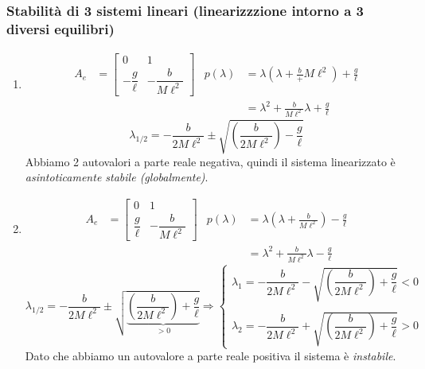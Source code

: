 \documentclass{article}
\numberwithin{equation}{subsection}
\begin{document}
\subsubsection{Stabilità di 3 sistemi lineari (linearizzzione intorno a 3 diversi equilibri)}
\begin{enumerate}
    \item 
    \begin{align*}
        A_e &= \begin{bmatrix} 0&1\\-\dfrac{g}{\ell}&-\dfrac{b}{M \ell^2} \end{bmatrix} & p(\lambda) &= \lambda \left( \lambda + \frac{b} +{M\ell^2} \right) + \frac{g}{\ell}\\
        & & &=\lambda^2 + \frac{b}{M\ell^2}\lambda + \frac{g}{\ell}
    \end{align*}
    \begin{equation}
        \lambda_{1/2} = - \frac{b}{2M \ell^2} \pm \sqrt{\left(\frac{b}{2M\ell^2}\right) - \frac{g}{\ell}}
    \end{equation}
    Abbiamo 2 autovalori a parte reale negativa, quindi il sistema linearizzato è \textit{asintoticamente stabile (globalmente)}.

    \item 
    \begin{align*}
        A_e &= \begin{bmatrix} 0&1\\\dfrac{g}{\ell}&-\dfrac{b}{M \ell^2} \end{bmatrix} & p(\lambda) &= \lambda \left( \lambda + \frac{b} {M\ell^2} \right) - \frac{g}{\ell}\\
        & & &=\lambda^2 + \frac{b}{M\ell^2}\lambda - \frac{g}{\ell}
    \end{align*}
    \begin{equation}
        \lambda_{1/2} = - \frac{b}{2M \ell^2} \pm \sqrt{\underbrace{\left(\frac{b}{2M\ell^2}\right) + \frac{g}{\ell}}_{>0}} \Longrightarrow
        \begin{cases}
            \lambda_{1} = - \dfrac{b}{2M \ell^2} - \sqrt{\left(\dfrac{b}{2M\ell^2}\right) + \dfrac{g}{\ell}} <0\\
            \\
            \lambda_{2} = - \dfrac{b}{2M \ell^2} + \sqrt{\left(\dfrac{b}{2M\ell^2}\right) + \dfrac{g}{\ell}} >0
        \end{cases}
    \end{equation}
    Dato che abbiamo un autovalore a parte reale positiva il sistema è \textit{instabile}.


\end{enumerate}
\end{document}
